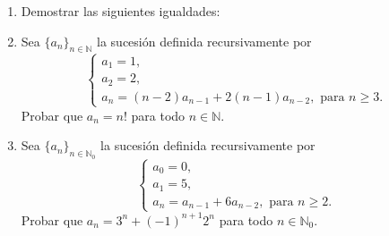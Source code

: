 \documentclass[a4paper,12pt,twoside,spanish,reqno]{amsbook}
\numberwithin{equation}{section}
\begin{document}
\begin{enumerate}[resume]
\item Demostrar las siguientes igualdades:

  \item   Sea $\{a_n\}_{n\in\mathbb N}$ la sucesión definida recursivamente por
  $$\begin{cases}
  a_1=1, \\a_2=2, \\a_{n} = (n-2)a_{n-1}+2(n-1)a_{n-2}, \text{ para $n\geq 3$}.
  \end{cases}$$
  Probar que $a_n=n!$ para todo $n\in \mathbb N$.

  \item   Sea $\{a_n\}_{n\in\mathbb N_0}$ la sucesión definida recursivamente por
  $$\begin{cases}
     a_0=0, \\a_1=5, \\a_{n} = a_{n-1}+6a_{n-2}, \text{ para $n\geq 2$}.
    \end{cases}$$
  Probar que $a_n=3^n + (-1)^{n+1}2^n$ para todo $n\in \mathbb N_0$.


\end{enumerate}
\end{document}
